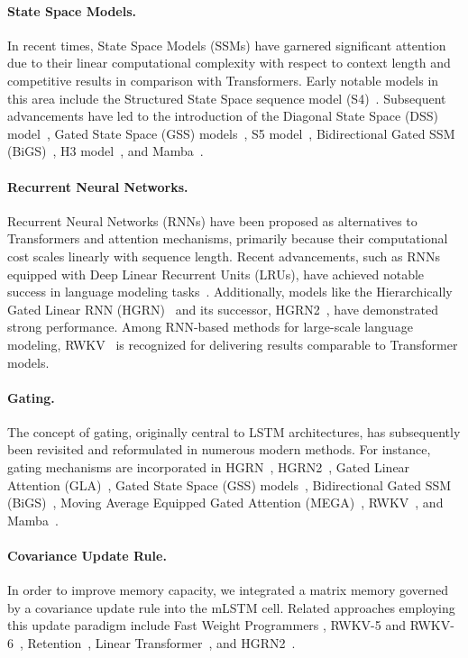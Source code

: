 \paragraph{State Space Models.} In recent times, State Space Models (SSMs) have garnered significant attention due to their linear computational complexity with respect to context length and competitive results in comparison with Transformers. Early notable models in this area include the Structured State Space sequence model (S4)~\citep{Gu:21}. Subsequent advancements have led to the introduction of the Diagonal State Space (DSS) model~\citep{Gupta:22}, Gated State Space (GSS) models~\citep{Mehta:22}, S5 model~\citep{Smith:22}, Bidirectional Gated SSM (BiGS)~\citep{Wang:22}, H3 model~\citep{Fu:23}, and Mamba~\citep{Gu:24arxiv}.

\paragraph{Recurrent Neural Networks.} Recurrent Neural Networks (RNNs) have been proposed as alternatives to Transformers and attention mechanisms, primarily because their computational cost scales linearly with sequence length. Recent advancements, such as RNNs equipped with Deep Linear Recurrent Units (LRUs), have achieved notable success in language modeling tasks~\citep{Orvieto:23, De:24arxiv}. Additionally, models like the Hierarchically Gated Linear RNN (HGRN)~\citep{Qin:23} and its successor, HGRN2~\citep{Qin:24arxiv}, have demonstrated strong performance. Among RNN-based methods for large-scale language modeling, RWKV~\citep{Peng:23arxivshort,Peng:24arxivshort} is recognized for delivering results comparable to Transformer models.

\paragraph{Gating.}
The concept of gating, originally central to LSTM architectures, has subsequently been revisited and reformulated in numerous modern methods. For instance, gating mechanisms are incorporated in HGRN~\citep{Qin:23}, HGRN2~\citep{Qin:24arxiv}, Gated Linear Attention (GLA)~\citep{Yang:23arxiv}, Gated State Space (GSS) models~\citep{Mehta:22}, Bidirectional Gated SSM (BiGS)~\citep{Wang:22}, Moving Average Equipped Gated Attention (MEGA)~\citep{Ma:22}, RWKV~\citep{Peng:23arxivshort}, and Mamba~\citep{Gu:24arxiv}.

\paragraph{Covariance Update Rule.} In order to improve memory capacity, we integrated a matrix memory governed by a covariance update rule into the mLSTM cell. Related approaches employing this update paradigm include Fast Weight Programmers \citep{Schmidhuber:92ncfastweights,Schlag:21}, RWKV-5 and RWKV-6~\citep{Peng:24arxivshort}, Retention~\citep{Sun:23arxiv}, Linear Transformer~\citep{Katharopoulos:20}, and HGRN2~\citep{Qin:24arxiv}.

